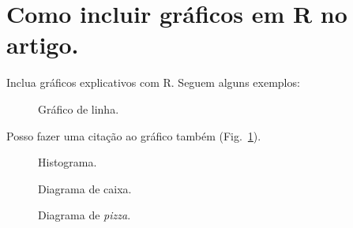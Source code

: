 \section{Como incluir gráficos em R no artigo.}

Inclua gráficos explicativos com R. Seguem alguns exemplos:

\begin{figure}
    \centering
    
    \caption{Gráfico de linha.}
    \label{graph:linha}
\end{figure}

\FloatBarrier %


Posso fazer uma citação ao gráfico também (Fig.~\ref{graph:linha}).

\begin{figure}
    \centering
    
    \caption{Histograma.}
    \label{graph:histograma}
\end{figure}


\begin{figure}
    \centering
    
    \caption{Diagrama de caixa.}
    \label{graph:box-plot}
\end{figure}

\begin{figure}
    \centering
    
    \caption{Diagrama de \textit{pizza}.}
    \label{graph:pie-plot}
\end{figure}


